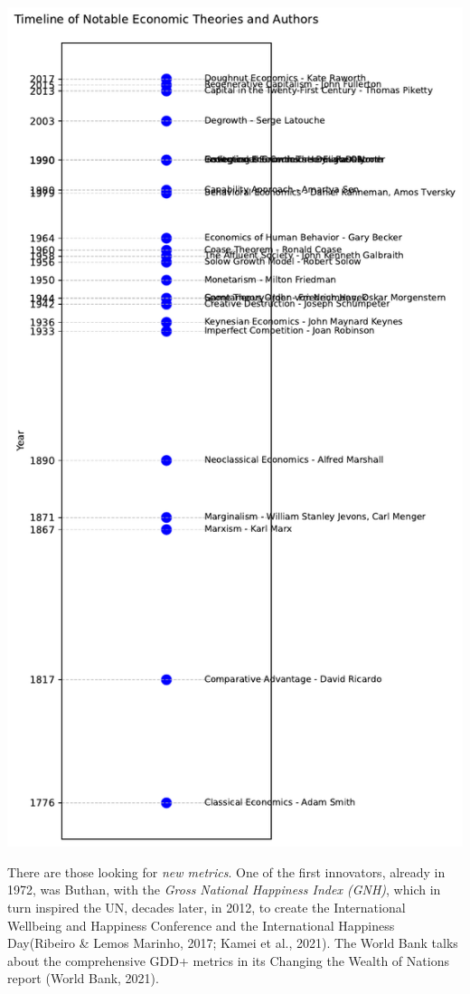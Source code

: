 \documentclass[
  letterpaper,
  DIV=11,
  numbers=noendperiod]{scrartcl}
\begin{document}
\includegraphics{_thesis_files/figure-pdf/cell-42-output-1.pdf}

There are those looking for \emph{new metrics}. One of the first
innovators, already in 1972, was Buthan, with the \emph{Gross National
Happiness Index (GNH)}, which in turn inspired the UN, decades later, in
2012, to create the International Wellbeing and Happiness Conference and
the International Happiness Day(Ribeiro \& Lemos Marinho, 2017; Kamei et
al., 2021). The World Bank talks about the comprehensive GDD+ metrics in
its Changing the Wealth of Nations report (World Bank, 2021).
\end{document}
